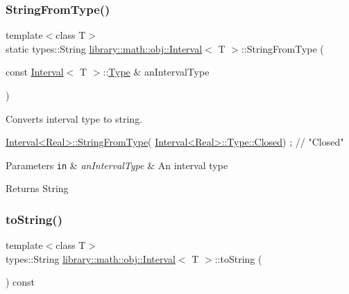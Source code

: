\subsubsection{\texorpdfstring{String\+From\+Type()}{StringFromType()}}
{\footnotesize\ttfamily template$<$class T$>$ \\
static types\+::\+String \hyperlink{classlibrary_1_1math_1_1obj_1_1_interval}{library\+::math\+::obj\+::\+Interval}$<$ T $>$\+::String\+From\+Type (\begin{DoxyParamCaption}\item[{const \hyperlink{classlibrary_1_1math_1_1obj_1_1_interval}{Interval}$<$ T $>$\+::\hyperlink{classlibrary_1_1math_1_1obj_1_1_interval_base_aabce6fa07a6e2e8fd3fcab5fd0d317d6}{Type} \&}]{an\+Interval\+Type }\end{DoxyParamCaption})\hspace{0.3cm}{\ttfamily [static]}}



Converts interval type to string. 


\begin{DoxyCode}
\hyperlink{classlibrary_1_1math_1_1obj_1_1_interval_a64a1850152db9b95c9824c71378d9f40}{Interval<Real>::StringFromType}(
      \hyperlink{classlibrary_1_1math_1_1obj_1_1_interval_base_aabce6fa07a6e2e8fd3fcab5fd0d317d6a03f4a47830f97377a35321051685071e}{Interval<Real>::Type::Closed}) ; \textcolor{comment}{// "Closed"}
\end{DoxyCode}



\begin{DoxyParams}[1]{Parameters}
\mbox{\tt in}  & {\em an\+Interval\+Type} & An interval type \\
\hline
\end{DoxyParams}
\begin{DoxyReturn}{Returns}
String 
\end{DoxyReturn}
\mbox{\label{classlibrary_1_1math_1_1obj_1_1_interval_ad75c400daf533c35bc91da8c50b00a9e}} 
\subsubsection{\texorpdfstring{to\+String()}{toString()}}
{\footnotesize\ttfamily template$<$class T$>$ \\
types\+::\+String \hyperlink{classlibrary_1_1math_1_1obj_1_1_interval}{library\+::math\+::obj\+::\+Interval}$<$ T $>$\+::to\+String (\begin{DoxyParamCaption}{ }\end{DoxyParamCaption}) const}



